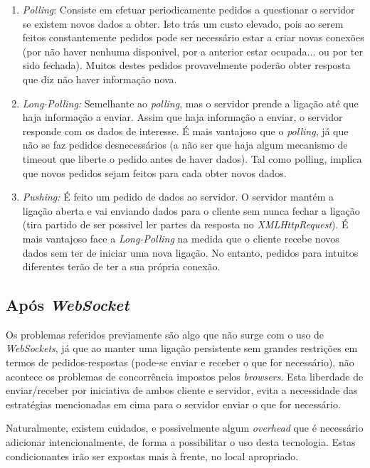 \documentclass[a4paper]{article}
\begin{document}
\begin{enumerate}
	\item{\emph{Polling}:} Consiste em efetuar periodicamente pedidos a questionar o servidor se existem novos dados a obter. Isto trás um custo elevado, pois ao serem feitos constantemente pedidos pode ser necessário estar a criar novas conexões (por não haver nenhuma disponivel, por a anterior estar ocupada... ou por ter sido fechada). Muitos destes pedidos provavelmente poderão obter resposta que diz não haver informação nova.

	\item{\emph{Long-Polling:}} Semelhante ao \emph{polling}, mas o servidor prende a ligação até que haja informação a enviar. Assim que haja informação a enviar, o servidor responde com os dados de interesse. É mais vantajoso que o \emph{polling}, já que não se faz pedidos desnecessários (a não ser que haja algum mecanismo de timeout que liberte o pedido antes de haver dados). Tal como polling, implica que novos pedidos sejam feitos para cada obter novos dados.
		
	\item{\emph{Pushing:}}  É feito um pedido de dados ao servidor. O servidor mantém a ligação aberta e vai enviando dados para o cliente sem nunca fechar a ligação (tira partido de ser possivel ler partes da resposta no \emph{XMLHttpRequest}). É mais vantajoso face a \emph{Long-Polling} na medida que o cliente recebe novos dados sem ter de iniciar uma nova ligação. No entanto, pedidos para intuitos diferentes terão de ter a sua própria conexão.
\end{enumerate}

\subsection{Após \emph{WebSocket}}

Os problemas referidos previamente são algo que não surge com o uso de \emph{WebSockets}, já que ao manter uma ligação persistente sem grandes restrições em termos de pedidos-respostas (pode-se enviar e receber o que for necessário), não acontece os problemas de concorrência impostos pelos \emph{browsers}. Esta liberdade de enviar/receber por iniciativa de ambos cliente e servidor, evita a necessidade das estratégias mencionadas em cima para o servidor enviar o que for necessário. 

Naturalmente, existem cuidados, e possivelmente algum \emph{overhead} que é necessário adicionar intencionalmente, de forma a possibilitar o uso desta tecnologia. Estas condicionantes irão ser expostas mais à frente, no local 
apropriado.
\end{document}
